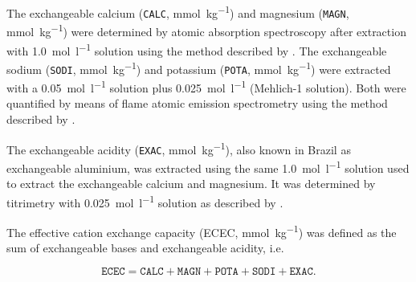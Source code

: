 {The exchangeable calcium (\texttt{CALC}, \si{\milli\mole\per\kilo\gram}) and magnesium (\texttt{MAGN}, 
\si{\milli\mole\per\kilo\gram}) were determined by atomic absorption spectroscopy after extraction with 
\SI{1.0}{\mole\per\litre}  solution using the method described by . 
The exchangeable sodium (\texttt{SODI}, \si{\milli\mole\per\kilo\gram}) and potassium (\texttt{POTA}, 
\si{\milli\mole\per\kilo\gram}) were extracted with a \SI{0.05}{\mole\per\litre}  solution plus 
\SI{0.025}{\mole\per\litre}  (Mehlich-\num{1} solution). Both were quantified by means of flame 
atomic emission spectrometry using the method described by .

The exchangeable acidity (\texttt{EXAC}, \si{\milli\mole\per\kilo\gram}), also known in Brazil as exchangeable 
aluminium, was extracted using the same \SI{1.0}{\mole\per\litre}  solution used to extract the 
exchangeable calcium and magnesium. It was determined by titrimetry with \SI{0.025}{\mole\per\litre} 
 solution as described by .


The effective cation exchange capacity (ECEC, \si{\milli\mole\per\kilo\gram}) was defined as the sum of 
exchangeable bases and exchangeable acidity, i.e. 

\begin{equation*}
 \texttt{ECEC} = \texttt{CALC} + \texttt{MAGN} + \texttt{POTA} + \texttt{SODI} + \texttt{EXAC}.
\end{equation*}



}
